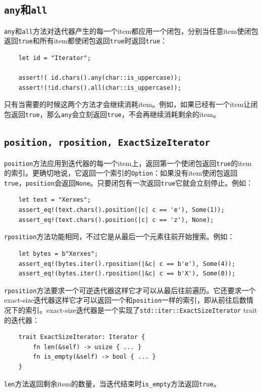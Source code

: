\subsection{\texttt{any}和\texttt{all}}
\texttt{any}和\texttt{all}方法对迭代器产生的每一个item都应用一个闭包，分别当任意item使闭包返回\texttt{true}和所有item都使闭包返回\texttt{true}时返回\texttt{true}：
\begin{verbatim}
    let id = "Iterator";

    assert!( id.chars().any(char::is_uppercase));
    assert!(!id.chars().all(char::is_uppercase));
\end{verbatim}

只有当需要的时候这两个方法才会继续消耗item。例如，如果已经有一个item让闭包返回\texttt{true}，那么\texttt{any}会立刻返回\texttt{true}，不会再继续消耗剩余的item。

\subsection{\texttt{position, rposition, ExactSizeIterator}}
\texttt{position}方法应用到迭代器的每一个item上，返回第一个使闭包返回\texttt{true}的item的索引。更确切地说，它返回一个索引的\texttt{Option}：如果没有item使闭包返回\texttt{true}，\texttt{position}会返回\texttt{None}。只要闭包有一次返回\texttt{true}它就会立刻停止。例如：
\begin{verbatim}
    let text = "Xerxes";
    assert_eq!(text.chars().position(|c| c == 'e'), Some(1));
    assert_eq!(text.chars().position(|c| c == 'z'), None);
\end{verbatim}

\texttt{rposition}方法功能相同，不过它是从最后一个元素往前开始搜索。例如：
\begin{verbatim}
    let bytes = b"Xerxes";
    assert_eq!(bytes.iter().rposition(|&c| c == b'e'), Some(4));
    assert_eq!(bytes.iter().rposition(|&c| c == b'X'), Some(0));
\end{verbatim}
\texttt{rposition}方法要求一个可逆迭代器这样它才可以从最后往前遍历。它还要求一个exact-size迭代器这样它才可以返回一个和\texttt{position}一样的索引，即从前往后数情况下的索引。exact-size迭代器是一个实现了\texttt{std::iter::ExactSizeIterator} trait的迭代器：
\begin{verbatim}
    trait ExactSizeIterator: Iterator {
        fn len(&self) -> usize { ... }
        fn is_empty(&self) -> bool { ... }
    }
\end{verbatim}

\texttt{len}方法返回剩余item的数量，当迭代结束时\texttt{is\_empty}方法返回\texttt{true}。

